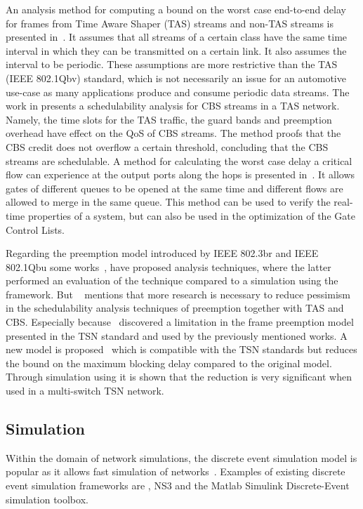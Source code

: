 An analysis method for computing a bound on the worst case end-to-end delay for frames from Time Aware Shaper (TAS) streams and non-TAS streams is presented in~\cite{thiele2015formal}. It assumes that all streams of a certain class have the same time interval in which they can be transmitted on a certain link. It also assumes the interval to be periodic. These assumptions are more restrictive than the TAS (IEEE 802.1Qbv) standard, which is not necessarily an issue for an automotive use-case as many applications produce and consume periodic data streams. The work in \cite{zhao2018timing} presents a schedulability analysis for CBS streams in a TAS network. Namely, the time slots for the TAS traffic, the guard bands and preemption overhead have effect on the QoS of CBS streams. The method proofs that the CBS credit does not overflow a certain threshold, concluding that the CBS streams are schedulable. A method for calculating the worst case delay a critical flow can experience at the output ports along the hops is presented in~\cite{zhao2018worst}. It allows gates of different queues to be opened at the same time and different flows are allowed to merge in the same queue. This method can be used to verify the real-time properties of a system, but can also be used in the optimization of the Gate Control Lists.

Regarding the preemption model introduced by IEEE 802.3br and IEEE 802.1Qbu some works~\cite{thiele2016formal},\cite{bello2020schedulability} have proposed analysis techniques, where the latter performed an evaluation of the technique compared to a simulation using the \omnet framework. But ~\cite{ashjaei2021time} mentions that more research is necessary to reduce pessimism in the schedulability analysis techniques of preemption together with TAS and CBS. Especially because~\cite{ashjaei2021novel} discovered a limitation in the frame preemption model presented in the TSN standard and used by the previously mentioned works. A new model is proposed~\cite{ashjaei2021novel} which is compatible with the TSN standards but reduces the bound on the maximum blocking delay compared to the original model. Through simulation using \omnet it is shown that the reduction is very significant when used in a multi-switch TSN network.

\subsection{Simulation}
\label{subsec:simulation}
Within the domain of network simulations, the discrete event simulation model is popular as it allows fast simulation of networks~\cite{ashjaei2021time}. Examples of existing discrete event simulation frameworks are \omnet, NS3 and the Matlab Simulink Discrete-Event simulation toolbox.

